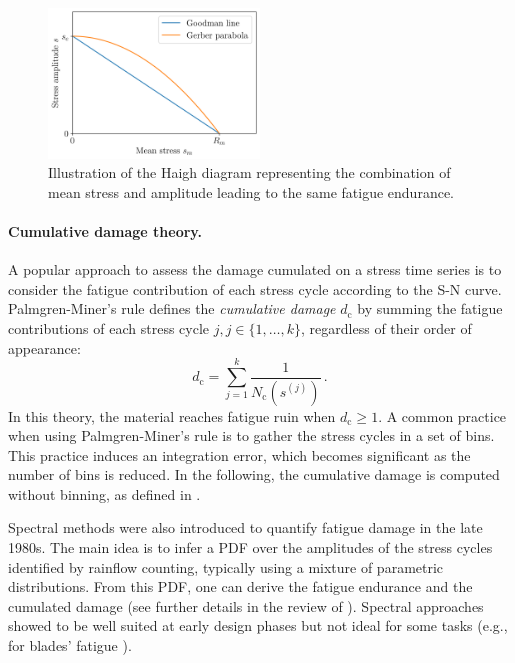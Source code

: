 \begin{figure}
    \centering
    \includegraphics[width=0.5\textwidth]{../numerical_experiments/chapter2/figures/haigh_diagram.png}
    \caption{Illustration of the Haigh diagram representing the combination of mean stress and amplitude leading to the same fatigue endurance.}
    \label{fig:haigh_diagram}
\end{figure}



\paragraph{Cumulative damage theory.}
A popular approach to assess the damage cumulated on a stress time series is to consider the fatigue contribution of each stress cycle according to the S-N curve. 
Palmgren-Miner's rule defines the \textit{cumulative damage} $d_{\mathrm{c}}$ by summing the fatigue contributions of each stress cycle $j, j \in \{1, \dots, k\}$, regardless of their order of appearance:
\begin{equation}
    d_{\mathrm{c}} = \sum_{j=1}^{k} \frac{1}{N_{\mathrm{c}}\left(s^{(j)}\right)} \, .
    \label{eq:miner}
\end{equation}
In this theory, the material reaches fatigue ruin when $d_{\mathrm{c}} \geq 1$.  
A common practice when using Palmgren-Miner's rule is to gather the stress cycles in a set of bins. 
This practice induces an integration error, which becomes significant as the number of bins is reduced. 
In the following, the cumulative damage is computed without binning, as defined in .

Spectral methods were also introduced to quantify fatigue damage in the late 1980s. 
The main idea is to infer a PDF over the amplitudes of the stress cycles identified by rainflow counting, typically using a mixture of parametric distributions. 
From this PDF, one can derive the fatigue endurance and the cumulated damage (see further details in the review of \citealp{dirlik_2021}). 
Spectral approaches showed to be well suited at early design phases but not ideal for some tasks (e.g., for blades' fatigue \citealp{ragan_2007_dirlik_vs_miner}). 

